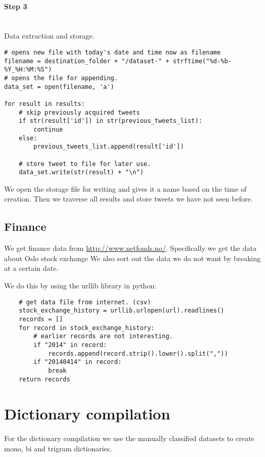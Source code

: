 \paragraph{Step 3}
\hspace{0pt}\\
Data extraction and storage.
\begin{verbatim}
# opens new file with today's date and time now as filename
filename = destination_folder + "/dataset-" + strftime("%d-%b-%Y_%H:%M:%S") 
# opens the file for appending.
data_set = open(filename, 'a')

for result in results:
    # skip previously acquired tweets
    if str(result['id']) in str(previous_tweets_list):
        continue
    else:
        previous_tweets_list.append(result['id'])
    
    # store tweet to file for later use.
    data_set.write(str(result) + "\n")
\end{verbatim}

We open the storage file for writing and gives it a name based on the time of
creation. Then we traverse all results and store tweets we have not seen
before. 

\subsection{Finance}
We get finance data from \url{http://www.netfonds.no/}. Specifically we get the
data about Oslo stock exchange
We also sort out the data we do not want by breaking at a certain date. 

We do this by using the urllib library in python: 
\begin{verbatim}
    # get data file from internet. (csv)
    stock_exchange_history = urllib.urlopen(url).readlines()
    records = []
    for record in stock_exchange_history:
        # earlier records are not interesting.
        if "2014" in record:
            records.append(record.strip().lower().split(","))
        if "20140414" in record:
            break
    return records
\end{verbatim}
%

\section{Dictionary compilation}\label{code:dictionary_compilation}
For the dictionary compilation we use the manually classified datasets to
create mono, bi and trigram dictionaries. 

